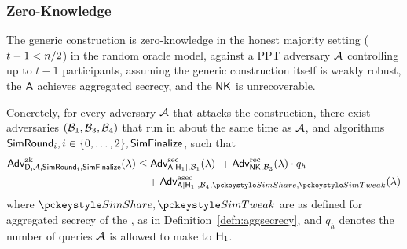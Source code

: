 \subsubsection{Zero-Knowledge}
\label{appendix:const-zk}

\begin{theorem} \label{thm:zero-knowledge}
  The generic construction is zero-knowledge in the honest majority setting
  ($t-1 < n/2$) in the random oracle model,
  against a PPT adversary $\mathcal{A}$ controlling up to $t-1$ participants,
  assuming the generic construction itself is weakly robust,
  the \AVSS $\mathsf{A}$ achieves aggregated secrecy,
  and the \ENIKE $\mathsf{NK}$ is unrecoverable.

  Concretely, for every adversary $\mathcal{A}$ that attacks the construction,
  there exist adversaries $(\mathcal{B}_1, \mathcal{B}_3, \mathcal{B}_4)$ that run in about the same time as $\mathcal{A}$,
  and algorithms $\mathsf{SimRound}_i, i \in \{0,\ldots,2 \}, \mathsf{SimFinalize}$,
  such that
  \begin{align} \label{eq:zk-thm}
  \begin{split}
      \advantzk{\dkg,\adv,\simkeygen_i,\simfin}(\lambda) & \leq \advantsecrecy{\avss[\Hash_1],\bdv_1}(\lambda)\ +
        \advant{rec}{\enike,\bdv_3}(\lambda) \cdot q_h \\
      & \quad + \advantaggsecrecy{\avss[\Hash_1], \bdv_4, \simshare,\simgettweak}(\lambda)
      \end{split}
  \end{align}
  where $\simshare, \simgettweak$ are as defined for aggregated secrecy of the \AVSS,
  as in Definition~\ref{defn:aggsecrecy},
  and $q_h$ denotes the number of queries $\mathcal{A}$ is allowed to make to $\mathsf{H}_1$.
\end{theorem}


